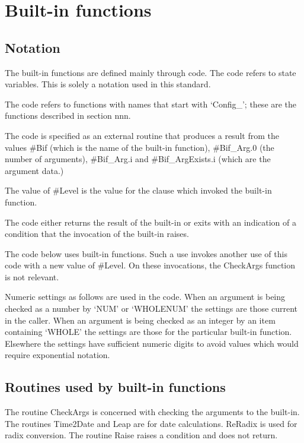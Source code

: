 \chapter{Built-in functions}\label{built-in-functions}

\section{Notation}\label{notation}

The built-in functions are defined mainly through code. The code refers
to state variables. This is solely a notation used in this standard.

The code refers to functions with names that start with `Config\_';
these are the functions described in section nnn.

The code is specified as an external routine that produces a result from
the values \#Bif (which is the name of the built-in function),
\#Bif\_Arg.0 (the number of arguments), \#Bif\_Arg.i and
\#Bif\_ArgExists.i (which are the argument data.)

The value of \#Level is the value for the clause which invoked the
built-in function.

The code either returns the result of the built-in or exits with an
indication of a condition that the invocation of the built-in raises.

The code below uses built-in functions. Such a use invokes another use
of this code with a new value of \#Level. On these invocations, the
CheckArgs function is not relevant.

Numeric settings as follows are used in the code. When an argument is
being checked as a number by `NUM' or `WHOLENUM' the settings are those
current in the caller. When an argument is being checked as an integer
by an item containing `WHOLE' the settings are those for the particular
built-in function. Elsewhere the settings have sufficient numeric digits
to avoid values which would require exponential notation.

\section{Routines used by built-in
functions}\label{routines-used-by-built-in-functions}

The routine CheckArgs is concerned with checking the arguments to the
built-in. The routines Time2Date and Leap are for date calculations.
ReRadix is used for radix conversion. The routine Raise raises a
condition and does not return.

